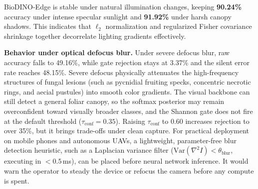 \documentclass[conference]{IEEEtran}
\begin{document}
\begin{table}[htbp]
\caption{Diagnostic Robustness Under Severe Field Environmental Corruptions}
\label{tab:stress_bench}
\centering
{}
\end{table}

BioDINO-Edge is stable under natural illumination changes, keeping \textbf{90.24\%} accuracy under intense specular sunlight and \textbf{91.92\%} under harsh canopy shadows. This indicates that $\ell_2$ normalization and regularized Fisher covariance shrinkage together decorrelate lighting gradients effectively.

\textbf{Behavior under optical defocus blur.} Under severe defocus blur, raw accuracy falls to 49.16\%, while gate rejection stays at 3.37\% and the silent error rate reaches 48.15\%. Severe defocus physically attenuates the high-frequency structures of fungal lesions (such as pycnidial fruiting specks, concentric necrotic rings, and aecial pustules) into smooth color gradients. The visual backbone can still detect a general foliar canopy, so the softmax posterior may remain overconfident toward visually broader classes, and the Shannon gate does not fire at the default threshold ($\tau_{\text{conf}} = 0.35$). Raising $\tau_{\text{conf}}$ to 0.60 increases rejection to over 35\%, but it brings trade-offs under clean capture. For practical deployment on mobile phones and autonomous UAVs, a lightweight, parameter-free blur detection heuristic, such as a Laplacian variance filter ($\text{Var}(\nabla^2 I) < \theta_{\text{blur}}$, executing in $<0.5$\,ms), can be placed before neural network inference. It would warn the operator to steady the device or refocus the camera before any compute is spent.
\end{document}

